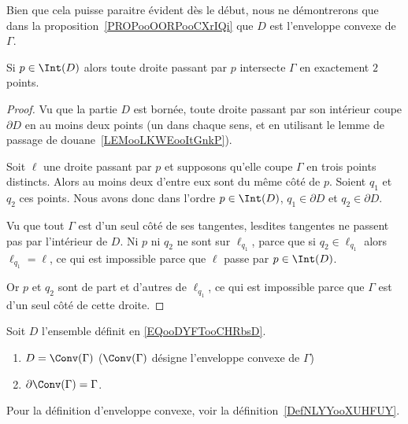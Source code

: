 \begin{remark}
	Bien que cela puisse paraitre évident dès le début, nous ne démontrerons que dans la proposition~\ref{PROPooOORPooCXrIQi} que \( D\) est l'enveloppe convexe de \( \Gamma\).
\end{remark}

\begin{corollary}       \label{CORooSXDGooJEmVcf}
	Si \( p\in\Int(D)\) alors toute droite passant par \( p\) intersecte \( \Gamma\) en exactement \( 2\) points.
\end{corollary}

\begin{proof}
	Vu que la partie \( D\) est bornée, toute droite passant par son intérieur coupe \( \partial D\) en au moins deux points (un dans chaque sens, et en utilisant le lemme de passage de douane~\ref{LEMooLKWEooItGnkP}).

	Soit \( \ell\) une droite passant par \( p\) et supposons qu'elle coupe \( \Gamma\) en trois points distincts. Alors au moins deux d'entre eux sont du même côté de \( p\). Soient \( q_1\) et \( q_2\) ces points. Nous avons donc dans l'ordre \( p\in \Int(D)\), \( q_1\in\partial D\) et \( q_2\in \partial D\).

	Vu que tout \( \Gamma\) est d'un seul côté de ses tangentes, lesdites tangentes ne passent pas par l'intérieur de \( D\). Ni \( p\) ni \( q_2\) ne sont sur \( \ell_{q_1}\), parce que si \( q_2\in\ell_{q_1}\) alors \( \ell_{q_1}=\ell\), ce qui est impossible parce que \( \ell\) passe par \( p\in\Int(D)\).

	Or \( p\) et \( q_2\) sont de part et d'autres de \( \ell_{q_1}\), ce qui est impossible parce que \( \Gamma\) est d'un seul côté de cette droite.
\end{proof}

\begin{proposition}     \label{PROPooOORPooCXrIQi}
	Soit \( D\) l'ensemble définit en \eqref{EQooDYFTooCHRbsD}.
	\begin{enumerate}
		\item
		      \( D=\Conv(\Gamma)\) (\( \Conv(\Gamma)\) désigne l'enveloppe convexe de \( \Gamma\))
		\item
		      \( \partial\Conv(\Gamma)=\Gamma\).
	\end{enumerate}
	Pour la définition d'enveloppe convexe, voir la définition~\ref{DefNLYYooXUHFUY}.
\end{proposition}

